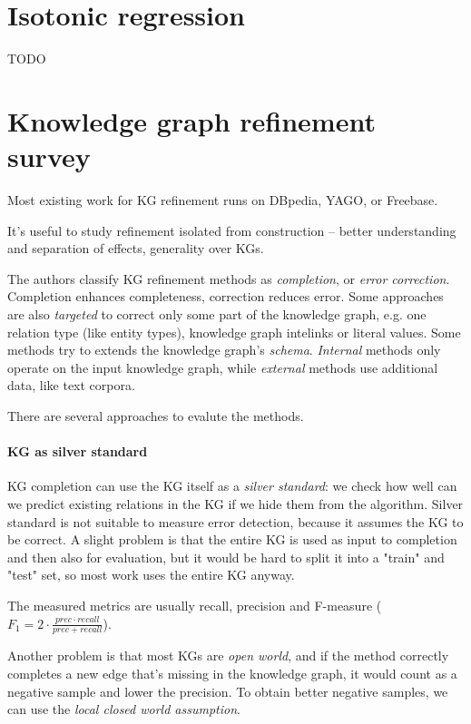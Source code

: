 \section{Isotonic regression}
TODO

\section{Knowledge graph refinement survey\cite{kg-refinement-survey}}

Most existing work for KG refinement runs on DBpedia, YAGO, or Freebase.

It's useful to study refinement isolated from construction -- better
understanding and separation of effects, generality over KGs.

The authors classify KG refinement methods as \textit{completion}, or
\textit{error correction}. Completion enhances completeness, correction
reduces error.
Some approaches are also \textit{targeted} to correct only some part of the
knowledge graph, e.g. one relation type (like entity types), knowledge graph
intelinks or literal values.
Some methods try to extends the knowledge graph's \textit{schema}.
\textit{Internal} methods only operate on the input knowledge graph, while
\textit{external} methods use additional data, like text corpora.

There are several approaches to evalute the methods.
\paragraph{KG as silver standard}
KG completion can use the KG itself as a \textit{silver standard}: we check how
well can we predict existing relations in the KG if we hide them from the
algorithm. Silver standard is not suitable to measure error detection, because
it assumes the KG to be correct.
A slight problem is that the entire KG is used as input to completion and then
also for evaluation, but it would be hard to split it into a "train" and "test"
set, so most work uses the entire KG anyway.

The measured metrics are usually recall, precision and F-measure ($F_1 =
2\cdot\frac{prec \cdot recall}{prec + recall}$).

Another problem is that most KGs are \textit{open world}, and if the method
correctly completes a new edge that's missing in the knowledge graph, it would
count as a negative sample and lower the precision. To obtain better negative
samples, we can use the \textit{local closed world assumption}.

